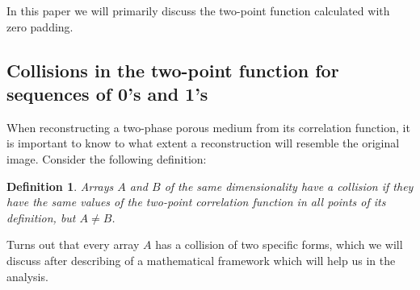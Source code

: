 \documentclass[12pt, a4paper]{article}
\newtheorem{definition}{Definition}
\begin{document}
In this paper we will primarily discuss the two-point function calculated with
zero padding.

\subsection{Collisions in the two-point function for sequences of 0's and 1's}
When reconstructing a two-phase porous medium from its correlation function, it
is important to know to what extent a reconstruction will resemble the original
image. Consider the following definition:
\begin{definition}
  Arrays $A$ and $B$ of the same dimensionality have a collision if they have
  the same values of the two-point correlation function in all points of its
  definition, but $A \ne B$.
\end{definition}

Turns out that every array $A$ has a collision of two specific forms, which we
will discuss after describing of a mathematical framework which will help us in
the analysis.
\end{document}
